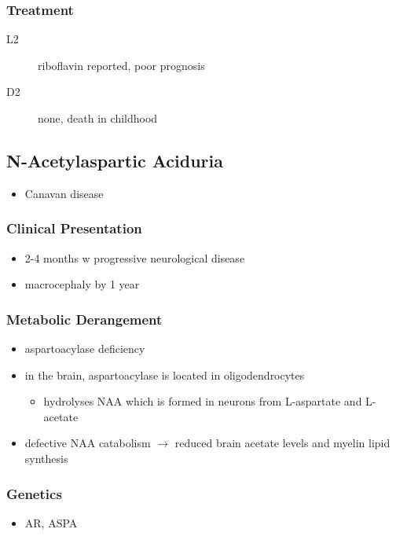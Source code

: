 \documentclass{scrartcl}
\begin{document}
\subsubsection{Treatment}
\label{sec:org67ca52a}
\begin{description}
\item[{L2}] riboflavin reported, poor prognosis
\item[{D2}] none, death in childhood
\end{description}

\subsection{N-Acetylaspartic Aciduria}
\label{sec:org15cbac2}
\begin{itemize}
\item Canavan disease
\end{itemize}
\subsubsection{Clinical Presentation}
\label{sec:org975557e}
\begin{itemize}
\item 2-4 months w progressive neurological disease
\item macrocephaly by 1 year
\end{itemize}

\subsubsection{Metabolic Derangement}
\label{sec:orgd2d76fb}
\begin{itemize}
\item aspartoacylase deficiency
\end{itemize}
\begin{itemize}
\item in the brain, aspartoacylase is located in oligodendrocytes
\begin{itemize}
\item hydrolyses NAA which is formed in neurons from L-aspartate and
L-acetate
\end{itemize}
\item defective NAA catabolism \(\to\) reduced brain acetate levels and myelin
lipid synthesis
\end{itemize}

\subsubsection{Genetics}
\label{sec:org10e29e3}
\begin{itemize}
\item AR, ASPA
\end{itemize}
\end{document}
